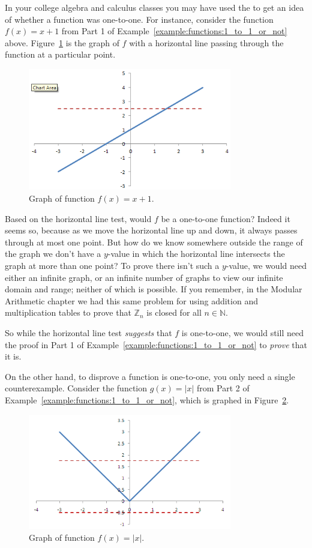 \begin{rem}\label{rem:onetoone}
In your college algebra and calculus classes you may have used the  to get an idea of whether a function was one-to-one.  For instance, consider the function $f(x)=x +1$ from Part 1 of Example~\ref{example:functions:1_to_1_or_not} above.  Figure~\ref{fig:xplus1} is the graph of $f$ with a horizontal line passing through the function at a particular point.
\begin{figure}[h]
\includegraphics[width=3.5in]{images/xplus1.png}
\caption{Graph of function $f(x)=x +1$.}
\label{fig:xplus1}
\end{figure}

Based on the horizontal line test, would $f$ be a one-to-one function?  Indeed it seems so, because as we move the horizontal line up and down, it always passes through at most one point.  But how do we know somewhere outside the range of the graph we don't have a $y$-value in which the horizontal line intersects the graph at more than one point?  To prove there isn't such a $y$-value, we would need either an infinite graph, or an infinite number of graphs to view our infinite domain and range; neither of which is possible.  If you remember, in the Modular Arithmetic chapter we had this same problem for using addition and multiplication tables to prove that ${\mathbb Z}_n$ is closed for all $n \in {\mathbb N}$.   

So while the horizontal line test \emph{suggests} that $f$ is one-to-one, we would still need the proof in Part 1 of Example~\ref{example:functions:1_to_1_or_not} to \emph{prove} that it is.

On the other hand, to disprove a function is one-to-one, you only need a single counterexample.  Consider the function $g(x)= |x|$ from Part 2 of Example~\ref{example:functions:1_to_1_or_not}, which is graphed in Figure~\ref{fig:absx}.
\begin{figure}[h]
\includegraphics[width=3.5in]{images/absx.png}
\caption{Graph of function $f(x)=|x|$.}
\label{fig:absx}
\end{figure}


\end{rem}
